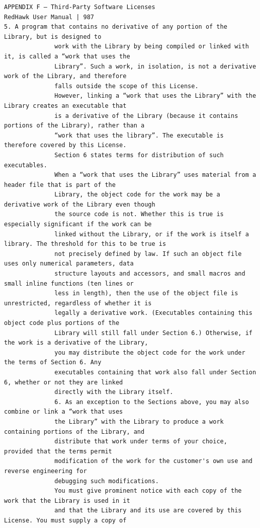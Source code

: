 \begin{lstlisting}[basicstyle=\ttfamily\scriptsize,breaklines=true]
APPENDIX F — Third-Party Software Licenses                                        RedHawk User Manual | 987
5. A program that contains no derivative of any portion of the Library, but is designed to
              work with the Library by being compiled or linked with it, is called a “work that uses the
              Library”. Such a work, in isolation, is not a derivative work of the Library, and therefore
              falls outside the scope of this License.
              However, linking a “work that uses the Library” with the Library creates an executable that
              is a derivative of the Library (because it contains portions of the Library), rather than a
              “work that uses the library”. The executable is therefore covered by this License.
              Section 6 states terms for distribution of such executables.
              When a “work that uses the Library” uses material from a header file that is part of the
              Library, the object code for the work may be a derivative work of the Library even though
              the source code is not. Whether this is true is especially significant if the work can be
              linked without the Library, or if the work is itself a library. The threshold for this to be true is
              not precisely defined by law. If such an object file uses only numerical parameters, data
              structure layouts and accessors, and small macros and small inline functions (ten lines or
              less in length), then the use of the object file is unrestricted, regardless of whether it is
              legally a derivative work. (Executables containing this object code plus portions of the
              Library will still fall under Section 6.) Otherwise, if the work is a derivative of the Library,
              you may distribute the object code for the work under the terms of Section 6. Any
              executables containing that work also fall under Section 6, whether or not they are linked
              directly with the Library itself.
              6. As an exception to the Sections above, you may also combine or link a “work that uses
              the Library” with the Library to produce a work containing portions of the Library, and
              distribute that work under terms of your choice, provided that the terms permit
              modification of the work for the customer's own use and reverse engineering for
              debugging such modifications.
              You must give prominent notice with each copy of the work that the Library is used in it
              and that the Library and its use are covered by this License. You must supply a copy of

\end{lstlisting}
